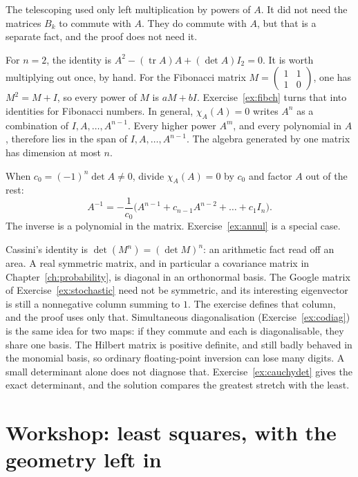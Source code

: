 The telescoping used only left multiplication by powers of $A$. It did not need the matrices $B_k$ to commute with $A$. They do commute with $A$, but that is a separate fact, and the proof does not need it.

\begin{examplex}
For $n=2$, the identity is $A^2-(\operatorname{tr}A)A+(\det A)I_2=0$. It is worth multiplying out once, by hand. For the Fibonacci matrix $M=\begin{pmatrix}1&1\\1&0\end{pmatrix}$, one has $M^2=M+I$, so every power of $M$ is $aM+bI$. Exercise~\ref{ex:fibch} turns that into identities for Fibonacci numbers. In general, $\chi_A(A)=0$ writes $A^n$ as a combination of $I,A,\dots,A^{n-1}$. Every higher power $A^m$, and every polynomial in $A$, therefore lies in the span of $I,A,\dots,A^{n-1}$. The algebra generated by one matrix has dimension at most $n$.

When $c_0=(-1)^n\det A\ne0$, divide $\chi_A(A)=0$ by $c_0$ and factor $A$ out of the rest:
\[
A^{-1}=-\frac1{c_0}\bigl(A^{n-1}+c_{n-1}A^{n-2}+\dots+c_1I_n\bigr).
\]
The inverse is a polynomial in the matrix. Exercise~\ref{ex:annul} is a special case.
\end{examplex}

\begin{beauty}
Cassini's identity is $\det(M^n)=(\det M)^n$: an arithmetic fact read off an area. A real symmetric matrix, and in particular a covariance matrix in Chapter~\ref{ch:probability}, is diagonal in an orthonormal basis. The Google matrix of Exercise~\ref{ex:stochastic} need not be symmetric, and its interesting eigenvector is still a nonnegative column summing to $1$. The exercise defines that column, and the proof uses only that. Simultaneous diagonalisation (Exercise~\ref{ex:codiag}) is the same idea for two maps: if they commute and each is diagonalisable, they share one basis. The Hilbert matrix is positive definite, and still badly behaved in the monomial basis, so ordinary floating-point inversion can lose many digits. A small determinant alone does not diagnose that. Exercise~\ref{ex:cauchydet} gives the exact determinant, and the solution compares the greatest stretch with the least.
\end{beauty}

\section{Workshop: least squares, with the geometry left in}

